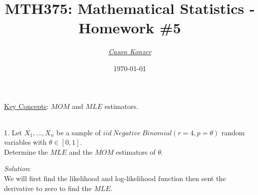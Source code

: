 \documentclass[12pt]{article}
\newcommand{\XB}{\color{black}}
\newcommand{\XBB}{\color{blue}}
\newcommand{\XV}{\color{violet}}
\begin{document}
\title{\textbf{MTH375}: Mathematical Statistics - Homework \#5}
\date{\today}
\author{\XV\textit{\large{\href{https://github.com/casonk}{Cason Konzer}}}\XB}

\maketitle
\hrulefill
\vfill
    \underline{Key Concepts}: $ MOM $ and $ MLE $ estimators.

\newpage
\newpage
\XBB\hrulefill\XB \\

1. Let $ X_{1}, \dots , X_{n} $ be a sample of $ iid \ Negative \ Binomial(r = 4, p = \theta) $ random variables
with $ \theta \in [0, 1] $. \\

Determine the $ MLE $ and the $ MOM $ estimators of $ \theta $. \\

\XBB\hrulefill\XB
\vspace{5mm}

\textit{Solution}:
\vspace{2.5mm} \\

\noindent
We will first find the likelihood and log-likelihood function then sent the derivative to zero to find the $ MLE $. \\
\end{document}
